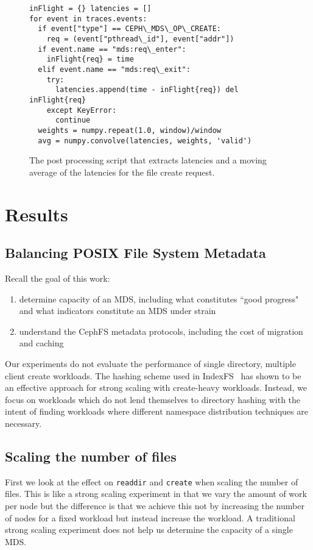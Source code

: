 \documentclass[conference]{acm_proc_article-sp} \usepackage[english]{babel}
\begin{document}
\begin{figure}
  \begin{verbatim} 
inFlight = {} latencies = [] 
for event in traces.events: 
  if event["type"] == CEPH\_MDS\_OP\_CREATE: 
    req = (event["pthread\_id"], event["addr"]) 
  if event.name == "mds:req\_enter": 
    inFlight{req} = time 
  elif event.name == "mds:req\_exit": 
    try:
      latencies.append(time - inFlight{req}) del inFlight{req} 
    except KeyError:
      continue
  weights = numpy.repeat(1.0, window)/window 
  avg = numpy.convolve(latencies, weights, 'valid') 
  \end{verbatim}
\caption{The post processing script that extracts latencies and a moving
average of the latencies for the file create request.
\label{listing:post-processing}} 
\end{figure}

\section{Results}
\label{results}


\subsection{Balancing POSIX File System Metadata}
Recall the goal of this work:
\begin{enumerate}
  \item determine capacity of an MDS, including what constitutes ``good
  progress" and what indicators constitute an MDS under strain
  \item understand the CephFS metadata protocols, including the cost of
  migration and caching
\end{enumerate}

Our experiments do not evaluate the performance of single directory, multiple
client create workloads. The hashing scheme used in
IndexFS~\cite{ren:sc2014-indexfs} has shown to be an effective approach for
strong scaling with create-heavy workloads. Instead, we focus on workloads
which do not lend themselves to directory hashing with the intent of finding
workloads where different namespace distribution techniques are necessary.

\subsection{Scaling the number of files}
\label{scaling-the-number-of-files}

First we look at the effect on \texttt{readdir} and \texttt{create} when
scaling the number of files. This is like a strong scaling experiment in that
we vary the amount of work per node but the difference is that we achieve this
not by increasing the number of nodes for a fixed workload but instead increase
the workload. A traditional strong scaling experiment does not help us
determine the capacity of a single MDS.
\end{document}
